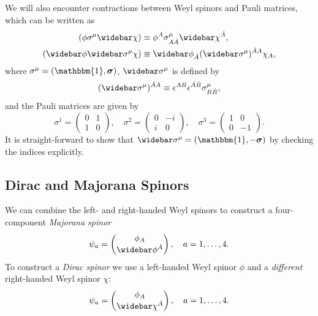 We will also encounter contractions between Weyl spinors and Pauli matrices, which can be written as
\begin{subequations}
\begin{align}
    (\phi\sigma^\mu\widebar\chi) &\equiv \phi^A \sigma^\mu_{A\dot{A}} \widebar\chi^{\dot{A}},
    \\
    (\widebar\phi\widebar\sigma^\mu\chi) &\equiv \widebar\phi_{\dot{A}} (\widebar\sigma^\mu)^{\dot{A}A} \chi_{A},
\end{align}
\end{subequations}
where $\sigma^\mu = (\mathbbm{1}, \vec\sigma)$, $\widebar\sigma^\mu$ is defined by
\begin{equation}\label{eq:sigmabar_def}
    (\widebar\sigma^\mu)^{\dot{A}A} \equiv \epsilon^{AB}\epsilon^{\dot{A}\dot{B}}\sigma^\mu_{B\dot{B}},
\end{equation}
and the Pauli matrices are given by
\begin{equation}\label{eq:pauli_matrices}
    \sigma^1 = \begin{pmatrix}
        0 & 1 \\ 1 & 0
    \end{pmatrix}, \quad \sigma^2 = \begin{pmatrix}
        0 & -i \\ i & 0
    \end{pmatrix}, \quad \sigma^3 = \begin{pmatrix}
        1 & 0 \\ 0 & -1
    \end{pmatrix}.
\end{equation}
It is straight-forward to show that $\widebar\sigma^\mu = (\mathbbm{1},-\vec\sigma)$ by checking the indices explicitly.

\subsection*{Dirac and Majorana Spinors}
We can combine the left- and right-handed Weyl spinors to construct a four-component \emph{Majorana spinor}
\begin{equation}
    \psi_a = \begin{pmatrix}
        \phi_A \\ \widebar\phi^{\dot{A}}
    \end{pmatrix}, \quad a=1,\ldots,4.
\end{equation}
To construct a \emph{Dirac spinor} we use a left-handed Weyl spinor $\phi$ and a \emph{different} right-handed Weyl spinor $\chi$:
\begin{equation}\label{eq:dirac_spinor_weyl_form}
    \psi_a = \begin{pmatrix}
        \phi_A \\ \widebar\chi^{\dot{A}}
    \end{pmatrix}, \quad a=1,\ldots,4.
\end{equation}

